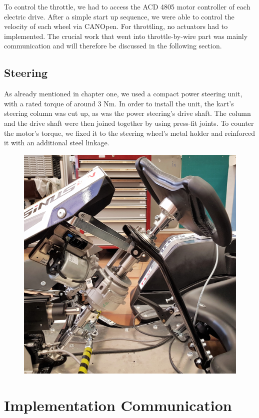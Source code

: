 To control the throttle, we had to access the ACD 4805 motor controller of each electric drive. After a simple start up sequence, we were able to control the velocity of each wheel via CANOpen. For throttling, no actuators had to implemented. The crucial work that went into throttle-by-wire part was mainly communication and will therefore be discussed in the following section.

\newpage

\subsection{Steering}

As already mentioned in chapter one, we used a compact power steering unit, with a rated torque of around 3 Nm. In order to install the unit, the kart's steering column was cut up, as was the power steering's drive shaft. The column and the drive shaft were then joined together by using press-fit joints. To counter the motor's torque, we fixed it to the steering wheel's metal holder and reinforced it with an additional steel linkage.

\begin{figure}[h]
	\centering
	\includegraphics[width=0.7\linewidth]{pictures_figures/Used/picture_powersteering}
	\caption{}
	\label{fig:picturepowersteering}
\end{figure}

\section{Implementation Communication}

